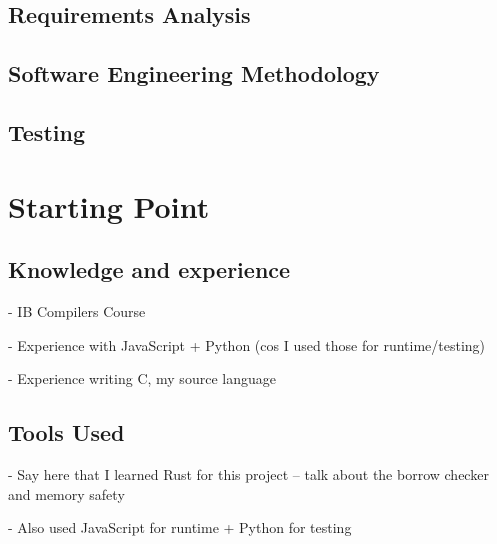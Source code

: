 \documentclass[00-main.tex]{subfiles}
\begin{document}
\subsection{Requirements Analysis}

\subsection{Software Engineering Methodology}

\subsection{Testing}

\section{Starting Point}

\subsection{Knowledge and experience}

\begin{mrwComment}
- IB Compilers Course

- Experience with JavaScript + Python (cos I used those for runtime/testing)

- Experience writing C, my source language
\end{mrwComment}

\subsection{Tools Used}

\begin{mrwComment}
- Say here that I learned Rust for this project -- talk about the borrow checker and memory safety

- Also used JavaScript for runtime + Python for testing
\end{mrwComment}
\end{document}
